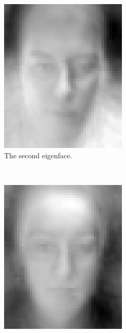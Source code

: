 \documentclass[a4paper, 10pt, conference]{ieeeconf}
\begin{document}
\begin{figure}[ht]
\begin{subfigure}{0.2\textwidth}
          \includegraphics[width=\textwidth]{src/eigface2.png}
                \caption{The second eigenface.}
                \label{fig:eigface2}
        \end{subfigure}
        ~
        \begin{subfigure}{0.2\textwidth}
          \includegraphics[width=\textwidth]{src/eigface3.png}

\end{subfigure}
\end{figure}
\end{document}
